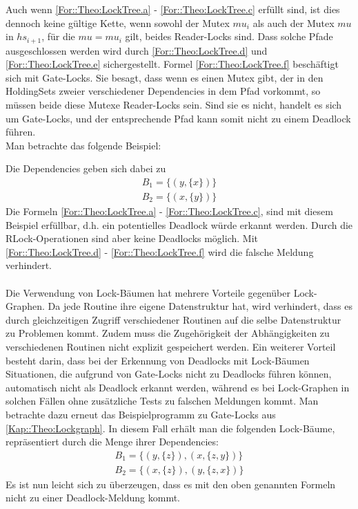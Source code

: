 Auch wenn \eqref{For::Theo:LockTree.a} - \eqref{For::Theo:LockTree.c} erfüllt sind, 
ist dies dennoch keine gültige Kette, wenn sowohl der
Mutex $mu_i$ als auch der Mutex $mu$ in $hs_{i+1}$, für die $mu = mu_i$ gilt, 
beides Reader-Locks sind. Dass solche Pfade ausgeschlossen werden wird durch 
\eqref{For::Theo:LockTree.d} und \eqref{For::Theo:LockTree.e} sichergestellt. Formel 
\eqref{For::Theo:LockTree.f} beschäftigt sich mit Gate-Locks. 
Sie besagt, dass wenn es einen Mutex gibt, 
der in den HoldingSets zweier verschiedener Dependencies in dem Pfad vorkommt, 
so müssen beide diese Mutexe Reader-Locks sein. Sind sie es nicht, handelt es 
sich um Gate-Locks, und der entsprechende Pfad kann somit nicht zu einem 
Deadlock führen.\\ Man betrachte das folgende Beispiel:
\begin{figure}[H]
    
\end{figure}
Die Dependencies geben sich dabei zu 
\begin{align*}
    B_1 = \{(y, \{x\})\}\\
    B_2 = \{(x, \{y\})\}
\end{align*}
Die Formeln \eqref{For::Theo:LockTree.a} - \eqref{For::Theo:LockTree.c}, 
sind mit diesem Beispiel erfüllbar, d.h. ein potentielles Deadlock würde 
erkannt werden. Durch die RLock-Operationen sind aber keine Deadlocks 
möglich. Mit \eqref{For::Theo:LockTree.d} - \eqref{For::Theo:LockTree.f} wird die 
falsche Meldung verhindert.\\\\
Die Verwendung von Lock-Bäumen hat mehrere Vorteile gegenüber Lock-Graphen. 
Da jede Routine ihre 
eigene Datenstruktur hat, wird verhindert, dass es durch 
gleichzeitigen Zugriff verschiedener Routinen auf die selbe Datenstruktur zu 
Problemen kommt. Zudem muss die Zugehörigkeit der Abhängigkeiten zu 
verschiedenen Routinen nicht explizit gespeichert werden. Ein weiterer Vorteil 
besteht darin, dass bei der Erkennung von Deadlocks mit Lock-Bäumen Situationen,
die aufgrund von Gate-Locks nicht zu Deadlocks führen können, automatisch nicht
als Deadlock erkannt werden, während es bei Lock-Graphen in solchen Fällen ohne 
zusätzliche Tests zu falschen Meldungen kommt. Man betrachte dazu erneut das 
Beispielprogramm zu Gate-Locks aus \ref{Kap::Theo:Lockgraph}.
In diesem Fall erhält man die folgenden Lock-Bäume, repräsentiert durch die Menge
ihrer Dependencies:
\begin{align*}
    B_1 = \{(y, \{z\}), (x, \{z, y\})\}\\
    B_2 = \{(x, \{z\}), (y, \{z, x\})\}
\end{align*}
Es ist nun leicht sich zu überzeugen, dass es mit den oben genannten Formeln nicht 
zu einer Deadlock-Meldung kommt.

